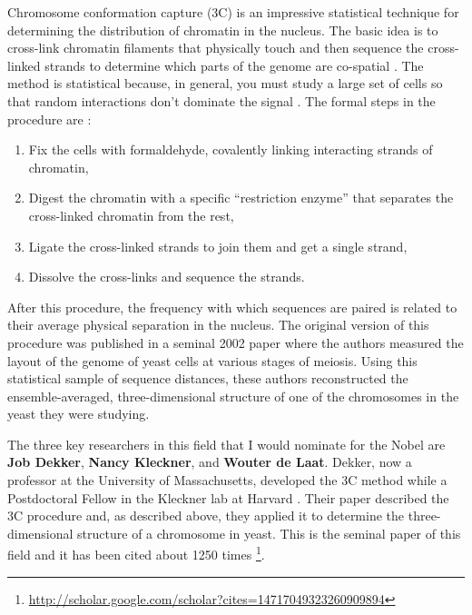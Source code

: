 \documentclass[12pt]{article}
\begin{document}
Chromosome conformation capture (3C) is an impressive statistical technique
for determining the distribution of chromatin in the nucleus.
The basic idea is to cross-link chromatin filaments that physically touch and
then sequence the cross-linked strands to determine which parts of the genome
are co-spatial \cite{3c-review1}.
The method is statistical because, in general, you must study a large set of
cells so that random interactions don't dominate the signal \cite{3c-review2}.
The formal steps in the procedure are \cite{3c-review1, 3c-review2}:
\begin{enumerate}

\item Fix the cells with formaldehyde, covalently linking interacting strands
of chromatin,

\item Digest the chromatin with a specific ``restriction enzyme'' that
separates the cross-linked chromatin from the rest,

\item Ligate the cross-linked strands to join them and get a single strand,

\item Dissolve the cross-links and sequence the strands.

\end{enumerate}
After this procedure, the frequency with which sequences are paired is related
to their average physical separation in the nucleus.
The original version of this procedure was published in a seminal 2002 paper
\cite{ccc} where the authors measured the layout of the genome of yeast cells
at various stages of meiosis.
Using this statistical sample of sequence distances, these authors
reconstructed the ensemble-averaged, three-dimensional structure of one of the
chromosomes in the yeast they were studying.

The three key researchers in this field that I would nominate for the Nobel
are {\bf Job Dekker}, {\bf Nancy Kleckner}, and {\bf Wouter de Laat}.
Dekker, now a professor at the University of Massachusetts, developed the 3C
method while a Postdoctoral Fellow in the Kleckner lab at Harvard \cite{ccc}.
Their paper \cite{ccc} described the 3C procedure and, as described above,
they applied it to determine the three-dimensional structure of a chromosome
in yeast.
This is the seminal paper of this field and it has been cited about 1250
times%
\footnote{\url{http://scholar.google.com/scholar?cites=14717049323260909894}}.
\end{document}
